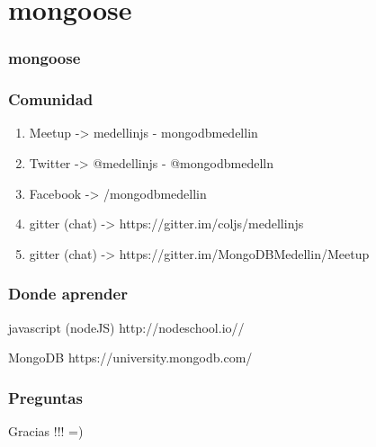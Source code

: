 \documentclass{beamer}
\begin{document}
\section{mongoose}
\begin{frame}
\frametitle{mongoose}
\end{frame}

\begin{frame}
\frametitle{Comunidad}
\begin{enumerate}
\item Meetup -> medellinjs  - mongodbmedellin
\item Twitter -> @medellinjs - @mongodbmedelln
\item Facebook -> /mongodbmedellin
\item gitter (chat) -> https://gitter.im/coljs/medellinjs
\item gitter (chat) -> https://gitter.im/MongoDBMedellin/Meetup
\end{enumerate}
\end{frame}
\begin{frame}
\frametitle{Donde aprender}
\footnotesize{
\begin{thebibliography}{99} %
 javascript (nodeJS)
\newblock http://nodeschool.io//
\end{thebibliography}
}
\footnotesize{
\begin{thebibliography}{99} %
 MongoDB
\newblock https://university.mongodb.com/
\end{thebibliography}
}
\end{frame}

\begin{frame}
\frametitle{Preguntas}
\end{frame}

\begin{frame}
\Huge{\centerline{Gracias !!! =)}}
\end{frame}
\end{document}
